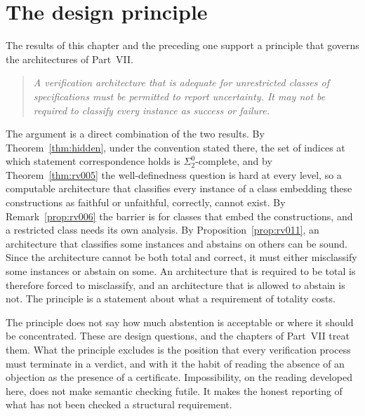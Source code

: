 \section{The design principle}

The results of this chapter and the preceding one support a principle that governs the architectures of Part~VII.

\begin{quote}
\emph{A verification architecture that is adequate for unrestricted classes of specifications must be permitted to report uncertainty. It may not be required to classify every instance as success or failure.}
\end{quote}

The argument is a direct combination of the two results. By Theorem~\ref{thm:hidden}, under the convention stated there, the set of indices at which statement correspondence holds is $\Sigma^0_2$-complete, and by Theorem~\ref{thm:rv005} the well-definedness question is hard at every level, so a computable architecture that classifies every instance of a class embedding these constructions as faithful or unfaithful, correctly, cannot exist. By Remark~\ref{prop:rv006} the barrier is for classes that embed the constructions, and a restricted class needs its own analysis. By Proposition~\ref{prop:rv011}, an architecture that classifies some instances and abstains on others can be sound. Since the architecture cannot be both total and correct, it must either misclassify some instances or abstain on some. An architecture that is required to be total is therefore forced to misclassify, and an architecture that is allowed to abstain is not. The principle is a statement about what a requirement of totality costs.

The principle does not say how much abstention is acceptable or where it should be concentrated. These are design questions, and the chapters of Part~VII treat them. What the principle excludes is the position that every verification process must terminate in a verdict, and with it the habit of reading the absence of an objection as the presence of a certificate. Impossibility, on the reading developed here, does not make semantic checking futile. It makes the honest reporting of what has not been checked a structural requirement.
